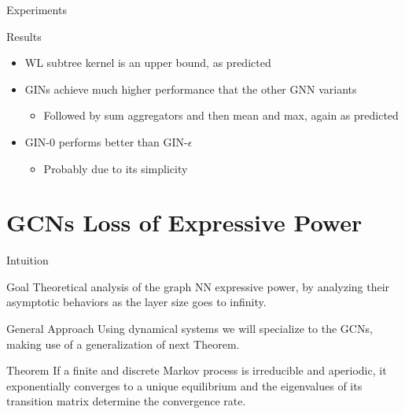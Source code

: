 \documentclass{beamer}
\theoremstyle{definition}
\begin{document}
\begin{frame}{Experiments}
    \begin{block}{Results}
        \begin{itemize}
            \item WL subtree kernel is an upper bound, as predicted
            \item GINs achieve much higher performance that the other GNN variants
                \begin{itemize}
                    \item Followed by sum aggregators and then mean and max, again as predicted
                \end{itemize}
            \item GIN-\(0\) performs better than GIN-\(\epsilon\)
                \begin{itemize}
                    \item Probably due to its simplicity
                \end{itemize}
        \end{itemize}
    \end{block}
\end{frame}

\section{GCNs Loss of Expressive Power}
\begin{frame}{Intuition}
    \begin{block}{Goal}
        Theoretical analysis of the graph NN expressive power, by analyzing their asymptotic behaviors as the layer size goes to infinity.
    \end{block} \pause
    \begin{block}{General Approach}
        Using dynamical systems we will specialize to the GCNs, making use of a generalization of next Theorem. 
    \end{block}\pause
    \begin{block}{Theorem}
        If a finite and discrete Markov process is irreducible and aperiodic, it exponentially converges to a unique equilibrium and the eigenvalues of its transition matrix determine the convergence rate.
    \end{block}    
\end{frame}
\end{document}
